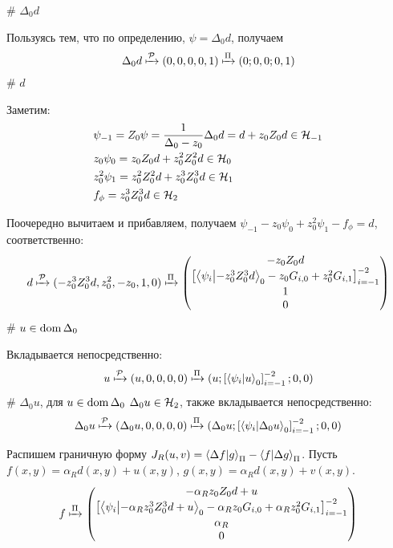 \begin{elist}
# $\Delta_0 d$

Пользуясь тем, что по определению, $\psi = \Delta_0 d$, получаем
\[
\Delta_0 d \xmapsto[]{\mathcal{P}} (0, 0, 0, 0, 1) \xmapsto[]{\Pi} (0; 0, 0; 0, 1)
\]
# $d$

Заметим:
\begin{align*}
& \psi_{-1} = Z_0 \psi = \frac{1}{\Delta_0 - z_0} \Delta_0 d = d + z_0 Z_0 d \in \mathcal{H}_{-1} \\
& z_0 \psi_{0} = z_0 Z_0 d + z_0^2 Z_0^2 d \in \mathcal{H}_{0} \\
& z_0^2 \psi_{1} = z_0^2 Z_0^2 d + z_0^3 Z_0^3 d \in \mathcal{H}_{1} \\
& f_\phi = z_0^3 Z_0^3 d \in \mathcal{H}_{2}
\end{align*}

Поочередно вычитаем и прибавляем, получаем  $\psi_{-1} - z_0 \psi_0 + z_0^2 \psi_1 - f_\phi =  d$, соответственно:
\[
d \xmapsto[]{\mcP} (-z_0^3 Z_0^3 d, z_0^2, -z_0, 1, 0) \xmapsto[]{\Pi}
\begin{pmatrix}
-z_0 Z_0 d \\
\left[ \ip{\psi_i}{-z_0^3 Z_0^3 d}_0 -z_0 G_{i, 0} + z_0^2 G_{i, 1}\right]_{i = -1}^{-2}\\
1\\
0
\end{pmatrix}
\]
# $u \in \operatorname{dom} \Delta_0$

Вкладывается непосредственно:
\[
u \xmapsto[]{\mcP} (u, 0, 0, 0, 0) \xmapsto[]{\Pi} (u;\left[ \ip{\psi_i}{u}_0 \right]_{i = -1}^{-2}; 0, 0)
\]
# $\Delta_0 u$, для $u \in \operatorname{dom} \Delta_0$
$\Delta_0 u \in \mathcal{H}_{2}$, также вкладывается непосредственно:
\[
\Delta_0 u \xmapsto[]{\mcP} (\Delta_0 u, 0, 0, 0, 0) \xmapsto[]{\Pi} (\Delta_0 u; \left[ \ip{\psi_i}{\Delta_0 u}_0 \right]_{i = -1}^{-2}; 0, 0)\]
\end{elist} %
Распишем граничную форму $J_R(u, v) = \ip{\Delta f}{g}_\Pi - \ip{f}{\Delta g}_\Pi$. Пусть $f(x, y) = \alpha_R d(x, y) + u(x, y)$, $g(x, y) = \alpha_R d(x, y) + v(x, y)$.
\[
f \xmapsto[]{\Pi}
\begin{pmatrix}
- \alpha_R z_0 Z_0 d + u \\
\left[ \ip{\psi_i}{- \alpha_R z_0^3 Z_0^3 d + u}_0 - \alpha_R z_0 G_{i, 0} + \alpha_R z_0^2 G_{i, 1} \right]_{i = -1}^{-2} \\
\alpha_R \\
0
\end{pmatrix}
\]

